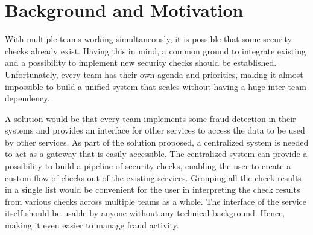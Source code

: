 \section{Background and Motivation}

  With multiple teams working simultaneously, it is possible that some security checks already exist. Having this in mind, a common ground to integrate existing and a possibility to implement new security checks should be established. Unfortunately, every team has their own agenda and priorities, making it almost impossible to build a unified system that scales without having a huge inter-team dependency. 

  A solution would be that every team implements some fraud detection in their systems and provides an interface for other services to access the data to be used by other services. As part of the solution proposed, a centralized system is needed to act as a gateway that is easily accessible. The centralized system can provide a possibility to build a pipeline of security checks, enabling the user to create a custom flow of checks out of the existing services. Grouping all the check results in a single list would be convenient for the user in interpreting the check results from various checks across multiple teams as a whole. The interface of the service itself should be usable by anyone without any technical background. Hence, making it even easier to manage fraud activity.